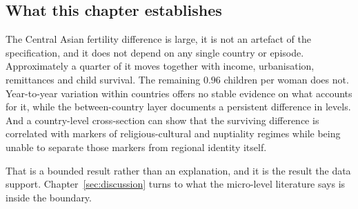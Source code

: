 \subsection{What this chapter establishes}
\label{sec:premium-summary}

The Central Asian fertility difference is large, it is not an artefact of the specification, and it does not depend on any single country or episode. Approximately a quarter of it moves together with income, urbanisation, remittances and child survival. The remaining $0.96$ children per woman does not. Year-to-year variation within countries offers no stable evidence on what accounts for it, while the between-country layer documents a persistent difference in levels. And a country-level cross-section can show that the surviving difference is correlated with markers of religious-cultural and nuptiality regimes while being unable to separate those markers from regional identity itself.

That is a bounded result rather than an explanation, and it is the result the data support. Chapter~\ref{sec:discussion} turns to what the micro-level literature says is inside the boundary.

